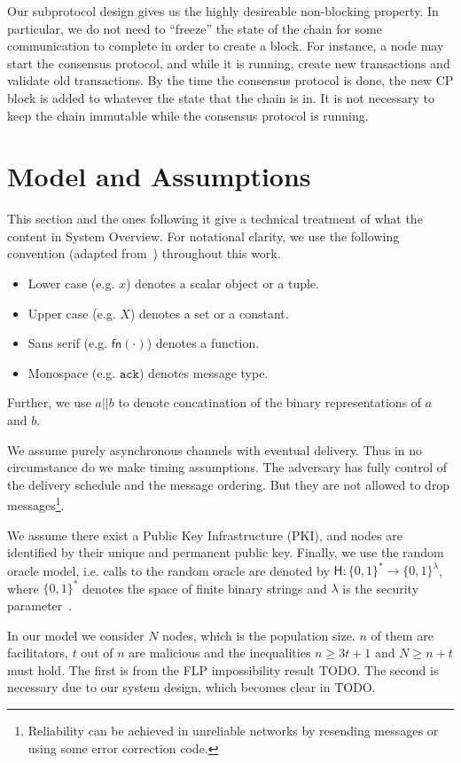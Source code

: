 Our subprotocol design gives us the highly desireable non-blocking property.
In particular, we do not need to ``freeze'' the state of the chain for some communication to complete in order to create a block.
For instance, a node may start the consensus protocol, and while it is running, create new transactions and validate old transactions.
By the time the consensus protocol is done, the new CP block is added to whatever the state that the chain is in.
It is not necessary to keep the chain immutable while the consensus protocol is running.

\section{Model and Assumptions}
\label{sec:model-assumptions}

This section and the ones following it give a technical treatment of what the content in System Overview.
For notational clarity, we use the following convention (adapted from~\cite{miller2016honey}) throughout this work.
\begin{itemize}
\item Lower case (e.g. $x$) denotes a scalar object or a tuple.
\item Upper case (e.g. $X$) denotes a set or a constant.
\item Sans serif (e.g. $\textsf{fn}(\cdot)$) denotes a function.
\item Monospace (e.g. $\texttt{ack}$) denotes message type.
\end{itemize}
Further, we use $a || b$ to denote concatination of the binary representations of $a$ and $b$.

We assume purely asynchronous channels with eventual delivery.
Thus in no circumstance do we make timing assumptions.
The adversary has fully control of the delivery schedule and the message ordering.
But they are not allowed to drop messages\footnote{
    Reliability can be achieved in unreliable networks by resending messages or using some error correction code.
}.

We assume there exist a Public Key Infrastructure (PKI), and nodes are identified by their unique and permanent public key.
Finally, we use the random oracle model, i.e. calls to the random oracle are denoted by $\textsf{H}: \{0, 1\}^* \rightarrow \{0, 1\}^\lambda$,
where $\{0, 1\}^*$ denotes the space of finite binary strings and $\lambda$ is the security parameter~\cite{bellare1993random}.

In our model we consider $N$ nodes, which is the population size.
$n$ of them are facilitators, $t$ out of $n$ are malicious and the inequalities
$n \ge 3t + 1$ and $N \ge n + t$ must hold.
The first is from the FLP impossibility result TODO.
The second is necessary due to our system design, which becomes clear in TODO.

